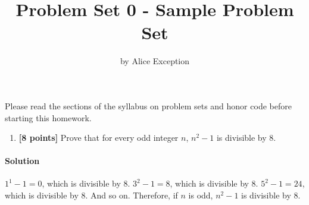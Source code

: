 \documentclass[11pt]{article}
\title{Problem Set 0 - Sample Problem Set}
\author{by Alice Exception}
\date{}
\begin{document}
\maketitle

Please read the sections of the syllabus on problem sets and honor code before starting this homework.


\begin{enumerate}
\item  \textbf{[8 points]} Prove that for every odd integer $n$, $n^2-1$ is divisible by 8. 

\end{enumerate}

{\paragraph{Solution} $1^1-1=0$, which is divisible by $8$. $3^2-1=8$, which is
divisible by $8$. $5^2-1=24$, which is divisible by $8$. And so on. Therefore, if
$n$ is odd, $n^2-1$ is divisible by $8.$ }
\end{document}
